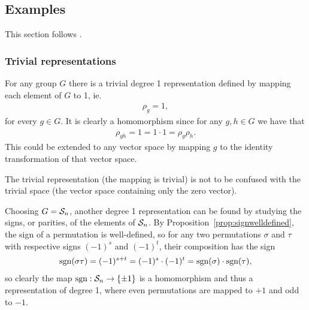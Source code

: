 \subsection{Examples}\label{sect:basicreprs}

This section follows \cite[1.2]{Serre}.

\subsubsection{Trivial representations}


\begin{example}
	For any group $G$ there is a trivial degree 1 representation defined by mapping each element of $G$ to 1, ie.
	\begin{align*}
		\rho_g = 1,
	\end{align*}
	for every $g \in G$. It is clearly a homomorphism since for any $g,h \in G$ we have that
	\begin{align*}
		\rho_{gh} = 1 = 1 \cdot 1 = \rho_g \rho_h.
	\end{align*}
	This could be extended to any vector space by mapping $g$ to the identity transformation of that vector space.
\end{example}

\begin{note}
	The trivial representation (the mapping is trivial) is not to be confused with the trivial space (the vector space containing only the zero vector).
\end{note}

\begin{example}
	Choosing $G = \mathcal{S}_n$, another degree 1 representation can be found by studying the signs, or parities, of the elements of $\mathcal{S}_n$. By Proposition~\ref{prop:signwelldefined}, the sign of a permutation is well-defined, so for any two permutations $\sigma$ and $\tau$ with respective signs $(-1)^s$ and $(-1)^t$, their composition has the sign
	\begin{align*}
		\text{sgn}(\sigma\tau) = (-1)^{s+t} = (-1)^s \cdot (-1)^t = \text{sgn} (\sigma) \cdot \text{sgn} (\tau),
	\end{align*}
	so clearly the map $\text{sgn}: \mathcal{S}_n \rightarrow \{\pm 1\}$ is a homomorphism and thus a representation of degree 1, where even permutations are mapped to $+1$ and odd to $-1$.
\end{example}

